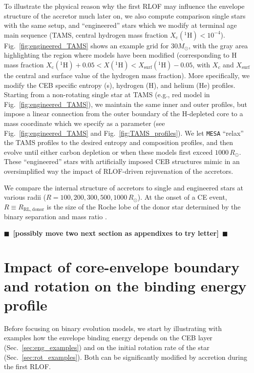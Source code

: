 \documentclass[twocolumn,twocolappendix,trackchanges]{aastex63}
\DeclareRobustCommand{\Figref}[1]{Fig.~\ref{#1}}
\DeclareRobustCommand{\Secref}[1]{Sec.~\ref{#1}}
\newcommand{\todo}[1]{{\large $\blacksquare$~\textbf{\color{red}[#1]}}~$\blacksquare$}
\begin{document}
To illustrate the physical reason why the first RLOF may influence the
envelope structure of the accretor much later on, we also compute
comparison single stars with the same setup, and ``engineered'' stars
which we modify at terminal age main sequence (TAMS, central hydrogen
mass fraction $X_\mathrm{c}(^1\mathrm{H})<10^{-4}$).
\Figref{fig:engineered_TAMS} shows an example grid for $30M_\odot$,
with the gray area highlighting the region where models have been
modified (corresponding to H mass fraction
$X_\mathrm{c}(^1\mathrm{H})+0.05<X(^1\mathrm{H})<X_\mathrm{surf}(^1\mathrm{H})-0.05$,
with $X_c$ and $X_\mathrm{surf}$ the central and surface value of the
hydrogen mass fraction). More specifically, we modify the CEB specific
entropy (s), hydrogen (H), and helium (He) profiles. Starting from a
non-rotating single star at TAMS (e.g., red model in
\Figref{fig:engineered_TAMS}), we maintain the same inner and outer
profiles, but impose a linear connection from the outer boundary of
the H-depleted core to a mass coordinate which we specify as a
parameter (see \Figref{fig:engineered_TAMS} and
\Figref{fig:TAMS_profiles}). We let \texttt{MESA} ``relax'' the TAMS
profiles to the desired entropy and composition profiles, and then
evolve until either carbon depletion or when these models first exceed
$1000\,R_\odot$.
These ``engineered'' stars with
artificially imposed CEB structures mimic in an oversimplified way the
impact of RLOF-driven rejuvenation of the accretors.

We compare the internal structure of accretors to single and
engineered stars at various radii
($R=100, 200, 300, 500, 1000\,R_\odot$). At the onset of a CE event,
$R\equiv R_\mathrm{RL, donor}$ is the size of the Roche lobe of the
donor star determined by the binary separation and mass ratio
\citep[e.g.,][]{paczynski:1971, eggleton:83}.%

\todo{possibly move two next section as appendixes to try letter}
\section{Impact of core-envelope boundary and rotation on the binding  energy profile}
\label{sec:intro_res}

Before focusing on binary evolution models, we start by illustrating
with examples how the envelope binding energy depends on the CEB layer
(\Secref{sec:eng_examples}) and on the initial rotation rate of the
star (\Secref{sec:rot_examples}). Both can be significantly modified
by accretion during the first RLOF.
\end{document}
